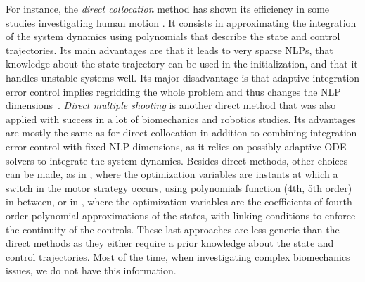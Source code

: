 For instance, the \textit{direct collocation} method has shown its efficiency in some studies investigating human motion \cite{febrer-nafriaComparisonDifferentOptimal2020, ezatiComparisonDirectCollocation2020}.
It consists in approximating the integration of the system dynamics using polynomials that describe the state and control trajectories.
Its main advantages are that it leads to very sparse NLPs, that knowledge about the state trajectory can be used in the initialization, and that it handles unstable systems well. 
Its major disadvantage is that adaptive integration error control implies regridding the whole problem and thus changes the NLP dimensions~\cite{diehl2006fast}.
\textit{Direct multiple shooting} is another direct method that was also applied with success in a lot of biomechanics \cite{koschorreck2012modeling, felis2013modeling, charbonneau2020optimal, bailly2020optimal} and robotics \cite{diehl2006fast, giftthaler2018control, bailly2018mechanical} studies.
Its advantages are mostly the same as for direct collocation in addition to combining integration error control with fixed NLP dimensions, as it relies on possibly adaptive ODE solvers to integrate the system dynamics.
Besides direct methods, other choices can be made, as in \cite{yeadon2000mechanics, begon2009effect}, where the optimization variables are instants at which a switch in the motor strategy occurs, using polynomials function (4th, 5th order) in-between, or in \cite{leboeuf2006energetic, huchez2015local}, where the optimization variables are the coefficients of fourth order polynomial approximations of the states, with linking conditions to enforce the continuity of the controls. 
These last approaches are less generic than the direct methods as they either require a prior knowledge about the state and control trajectories. 
Most of the time, when investigating complex biomechanics issues, we do not have this information. 

